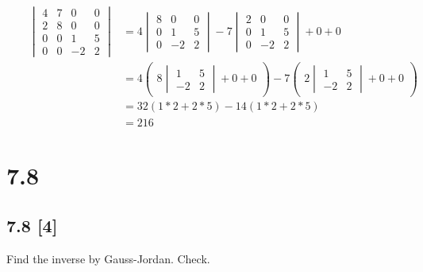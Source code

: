 \documentclass{article}
\begin{document}
\begin{align}
    \label{eq:1}
    && \begin{vmatrix}
    4&7&0&0\\
    2&8&0&0\\
    0&0&1&5\\
    0&0&-2&2 \end{vmatrix} &= 4\begin{vmatrix}8&0&0\\0&1&5\\0&-2&2\end{vmatrix}-7\begin{vmatrix}2&0&0\\0&1&5\\0&-2&2\end{vmatrix} + 0+0
    \\
    \label{eq:2}
    && &= 4 \begin{pmatrix} 8\begin{vmatrix}1&5\\-2&2 \end{vmatrix} +0+0\end{pmatrix}-7\begin{pmatrix}
    2\begin{vmatrix}1&5\\-2&2\end{vmatrix}+0+0
    \end{pmatrix}
    \\
    \label{eq:3}
    && &= 32(1*2+2*5)-14(1*2+2*5)
    \\
    \label{eq:4}
    && &= 216
\end{align}

\newpage

\section*{7.8}
\setcounter{equation}{0}

\subsection*{7.8 [4]}
\setcounter{equation}{0}

Find the inverse by Gauss-Jordan. Check.
\end{document}
